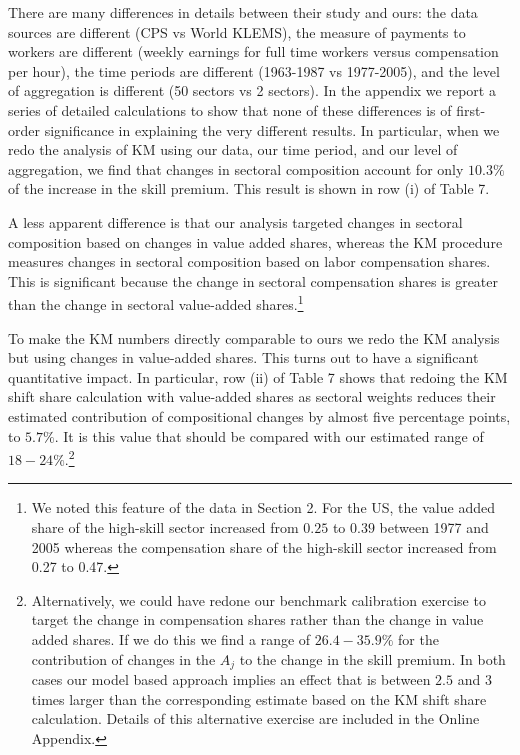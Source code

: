 \documentclass[12pt,english]{article}
\begin{document}
{\normalsize There are many differences in details between their study and
ours: the data sources are different (CPS vs World KLEMS), the measure of
payments to workers are different (weekly earnings for full time workers
versus compensation per hour), the time periods are different (1963-1987 vs
1977-2005), and the level of aggregation is different (50 sectors vs 2
sectors). In the appendix we report a series of detailed calculations to
show that none of these differences is of first-order significance in
explaining the very different results. In particular, when we redo the
analysis of KM using our data, our time period, and our level of
aggregation, we find that changes in sectoral composition account for only $%
10.3\%$ of the increase in the skill premium. This result is shown in row
(i) of Table 7. }

{\normalsize A less apparent difference is that our analysis targeted
changes in sectoral composition based on changes in value added shares,
whereas the KM procedure measures changes in sectoral composition based on
labor compensation shares. This is significant because the change in
sectoral compensation shares is greater than the change in sectoral
value-added shares.\footnote{%
We noted this feature of the data in Section 2. For the US, the value added
share of the high-skill sector increased from $0.25$ to $0.39$ between 1977
and 2005 whereas the compensation share of the high-skill sector increased
from 0.27 to 0.47.} }

{\normalsize To make the KM numbers directly comparable to ours we redo the
KM analysis but using changes in value-added shares. This turns out to have
a significant quantitative impact. In particular, row (ii) of Table 7 shows
that redoing the KM shift share calculation with value-added shares as
sectoral weights reduces their estimated contribution of compositional
changes by almost five percentage points, to $5.7\%$. It is this value that
should be compared with our estimated range of $18-24\%$.\footnote{%
Alternatively, we could have redone our benchmark calibration exercise to
target the change in compensation shares rather than the change in value
added shares. If we do this we find a range of $26.4-35.9\%$ for the
contribution of changes in the $A_{j}$ to the change in the skill premium.
In both cases our model based approach implies an effect that is between $%
2.5 $ and $3$ times larger than the corresponding estimate based on the KM
shift share calculation. Details of this alternative exercise are included
in the Online Appendix.} }
\end{document}
